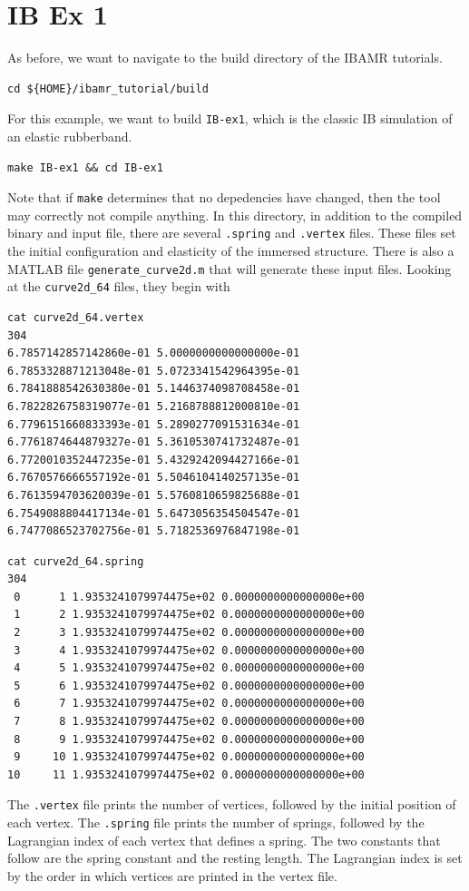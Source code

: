 \documentclass{article}
\begin{document}
\section{IB Ex 1}
As before, we want to navigate to the build directory of the IBAMR tutorials.
\begin{verbatim}
cd ${HOME}/ibamr_tutorial/build
\end{verbatim}
For this example, we want to build \verb|IB-ex1|, which is the classic IB simulation of an elastic rubberband.
\begin{verbatim}
make IB-ex1 && cd IB-ex1
\end{verbatim}
Note that if \verb|make| determines that no depedencies have changed, then the tool may correctly not compile anything. In this directory, in addition to the compiled binary and input file, there are several \verb|.spring| and \verb|.vertex| files. These files set the initial configuration and elasticity of the immersed structure. There is also a MATLAB file \verb|generate_curve2d.m| that will generate these input files. Looking at the \verb|curve2d_64| files, they begin with
\begin{multicols}{2}
\begin{verbatim}
cat curve2d_64.vertex
304
6.7857142857142860e-01 5.0000000000000000e-01
6.7853328871213048e-01 5.0723341542964395e-01
6.7841888542630380e-01 5.1446374098708458e-01
6.7822826758319077e-01 5.2168788812000810e-01
6.7796151660833393e-01 5.2890277091531634e-01
6.7761874644879327e-01 5.3610530741732487e-01
6.7720010352447235e-01 5.4329242094427166e-01
6.7670576666557192e-01 5.5046104140257135e-01
6.7613594703620039e-01 5.5760810659825688e-01
6.7549088804417134e-01 5.6473056354504547e-01
6.7477086523702756e-01 5.7182536976847198e-01
\end{verbatim}
\columnbreak
\begin{verbatim}
cat curve2d_64.spring
304
 0      1 1.9353241079974475e+02 0.0000000000000000e+00
 1      2 1.9353241079974475e+02 0.0000000000000000e+00
 2      3 1.9353241079974475e+02 0.0000000000000000e+00
 3      4 1.9353241079974475e+02 0.0000000000000000e+00
 4      5 1.9353241079974475e+02 0.0000000000000000e+00
 5      6 1.9353241079974475e+02 0.0000000000000000e+00
 6      7 1.9353241079974475e+02 0.0000000000000000e+00
 7      8 1.9353241079974475e+02 0.0000000000000000e+00
 8      9 1.9353241079974475e+02 0.0000000000000000e+00
 9     10 1.9353241079974475e+02 0.0000000000000000e+00
10     11 1.9353241079974475e+02 0.0000000000000000e+00
\end{verbatim}
\end{multicols}
The \verb|.vertex| file prints the number of vertices, followed by the initial position of each vertex. The \verb|.spring| file prints the number of springs, followed by the Lagrangian index of each vertex that defines a spring. The two constants that follow are the spring constant and the resting length. The Lagrangian index is set by the order in which vertices are printed in the vertex file.
\end{document}
